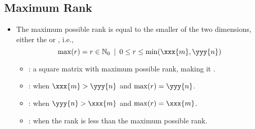 \begin{itemize}
  \subsection{Maximum Rank}\label{Maximum Rank}
  \begin{itemize}
  \item The maximum possible rank is equal to the smaller of the two dimensions, either the  or , i.e.,
  \[%
  \max(r) = r \in \mathbb{N}_0~\,|~\,0 \leq r \leq \min(\xxx{m},\yyy{n})
  \]%
    \begin{itemize}
      \item {}: a square matrix with maximum possible rank, making it \hyperref[Matrix Inverse]{}. 
      \item {}: when \(\xxx{m} > \yyy{n}\) and \(\max(r) = \yyy{n}\). 
      \item {}: when \(\yyy{n} > \xxx{m} \) and \(\max(r) = \xxx{m}\). 
      \item {}: when the rank is less than the maximum possible rank. 
    \end{itemize}
  \end{itemize}
\end{itemize}

